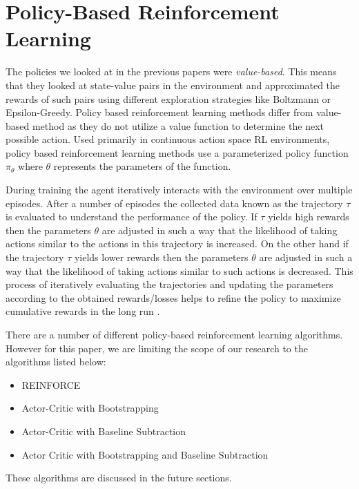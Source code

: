 \documentclass{article}
\begin{document}
\section{Policy-Based Reinforcement Learning}
The policies we looked at in the previous papers were \emph{value-based}. This means that they looked at state-value pairs in the environment and approximated the rewards of such pairs using different exploration strategies like Boltzmann or Epsilon-Greedy. Policy based reinforcement learning methods differ from value-based method as they do not utilize a value function to determine the next possible action. Used primarily in  continuous action space RL environments, policy based reinforcement learning methods use a parameterized policy function $\pi_\theta$ where $\theta$ represents the parameters of the function.
\par During training the agent iteratively interacts with the environment over multiple episodes. After a number of episodes the collected data known as the trajectory $\tau$ is evaluated to understand the performance of the policy. If $\tau$ yields high rewards then the parameters $\theta$ are adjusted in such a way that the likelihood of taking actions similar to the actions in this trajectory is increased. On the other hand if the trajectory $\tau$ yields lower rewards then the parameters $\theta$ are adjusted in such a way that the likelihood of taking actions similar to such actions is decreased. This process of iteratively evaluating the trajectories and updating the parameters according to the obtained rewards/losses helps to refine the policy to maximize cumulative rewards in the long run \cite{plaat-deeprl}. 
\par
There are a number of different policy-based reinforcement learning algorithms. However for this paper, we are limiting the scope of our research to the algorithms listed below: 

\begin{itemize}[itemsep=0pt]
\item REINFORCE
\item Actor-Critic with Bootstrapping
\item Actor-Critic with Baseline Subtraction
\item Actor Critic with Bootstrapping and Baseline Subtraction
\end{itemize}
These algorithms are discussed in the future sections. 
\end{document}
